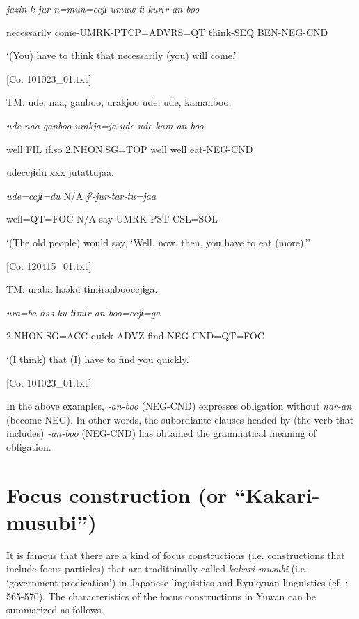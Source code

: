       \textit{jazin}  \textit{k-jur-n=mun=ccjɨ}  \textit{umuw-tɨ}  \textit{kurɨr-an-boo}

      necessarily  come-UMRK-PTCP=ADVRS=QT  think-SEQ  BEN-NEG-CND

      ‘(You) have to think that necessarily (you) will come.’

      [Co: 101023\_01.txt]

  \ex\relax[= (4-57)]

    TM:  ude,  naa,  ganboo,  urakjoo  ude,  ude,  kamanboo,

      \textit{ude}  \textit{naa}  \textit{ganboo}  \textit{urakja=ja}  \textit{ude}  \textit{ude}  \textit{kam-an-boo}

      well  FIL  if.so  2.NHON.SG=TOP  well  well  eat-NEG-CND

      udeccjɨdu  xxx  jutattujaa.

      \textit{ude=ccjɨ=du}  N/A  \textit{jˀ-jur-tar-tu=jaa}

      well=QT=FOC  N/A  say-UMRK-PST-CSL=SOL

      ‘(The old people) would say, ‘Well, now, then, you have to eat (more).’’

    [Co: 120415\_01.txt]

  \ex  TM:  uraba  həəku  tɨmɨranbooccjɨga.

      \textit{ura=ba}  \textit{həə-ku}  \textit{tɨmɨr-an-boo=ccjɨ=ga}

      2.NHON.SG=ACC  quick-ADVZ  find-NEG-CND=QT=FOC

      ‘(I think) that (I) have to find you quickly.’

      [Co: 101023\_01.txt]
\z
\z

In the above examples, \textit{{}-an-boo} (NEG-CND) expresses obligation without \textit{nar-an} (become-NEG). In other words, the subordiante clauses headed by (the verb that includes) \textit{{}-an-boo} (NEG-CND) has obtained the grammatical meaning of obligation.

\section{Focus construction (or “Kakari-musubi”)}\label{sec:11.3}

It is famous that there are a kind of focus constructions (i.e. constructions that include focus particles) that are traditoinally called \textit{kakari-musubi} (i.e. ‘government-predication’) in Japanese linguistics and Ryukyuan linguistics (cf. \citealt{Shimoji2008}: 565-570). The characteristics of the focus constructions in Yuwan can be summarized as follows.

